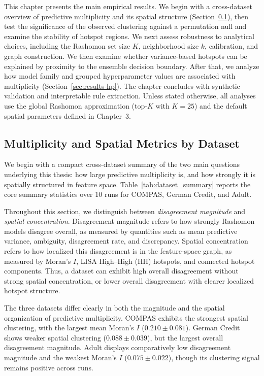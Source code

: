 This chapter presents the main empirical results. We begin with a cross-dataset overview
of predictive multiplicity and its spatial structure (Section~\ref{sec:results-metrics}), then
test the significance of the observed clustering against a permutation null and examine
the stability of hotspot regions. We next assess robustness to analytical choices, including 
the Rashomon set size $K$, neighborhood size $k$, calibration, and graph construction. We then examine whether
variance-based hotspots can be explained by proximity to the ensemble decision boundary.
After that, we analyze how model family and grouped hyperparameter values are
associated with multiplicity (Section~\ref{sec:results-hp}). The chapter concludes with synthetic validation and
interpretable rule extraction. Unless stated otherwise, all analyses use the global Rashomon
approximation (top-$K$ with $K=25$) and the default spatial parameters defined in
Chapter~3.


\subsection{Multiplicity and Spatial Metrics by Dataset}
\label{sec:results-metrics}

We begin with a compact cross-dataset summary of the two main questions underlying this thesis: 
how large predictive multiplicity is, and how strongly it is spatially structured in feature space.
Table~\ref{tab:dataset_summary} reports the core summary statistics over 10 runs for COMPAS, German Credit, and Adult.

Throughout this section, we distinguish between \emph{disagreement magnitude} and
\emph{spatial concentration}. Disagreement magnitude refers to how strongly Rashomon
models disagree overall, as measured by quantities such as mean predictive variance,
ambiguity, disagreement rate, and discrepancy. Spatial concentration
refers to how localized this disagreement is in the feature-space graph, as measured by
Moran's $I$, LISA High--High (HH) hotspots, and connected hotspot components. Thus, a dataset can
exhibit high overall disagreement without strong spatial concentration, or lower overall
disagreement with clearer localized hotspot structure.

The three datasets differ clearly in both the magnitude and the spatial organization of predictive 
multiplicity. COMPAS exhibits the strongest spatial clustering, with the largest mean Moran's $I$ 
($0.210 \pm 0.081$). German Credit shows weaker spatial clustering ($0.088 \pm 0.039$), but the 
largest overall disagreement magnitude. Adult displays comparatively low disagreement magnitude 
and the weakest Moran's $I$ ($0.075 \pm 0.022$), though its clustering signal remains positive 
across runs.

